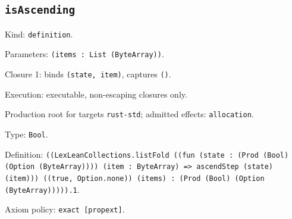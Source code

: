 \documentclass[11pt]{article}
\begin{document}
\subsection*{\texttt{isAscending}}
\noindent Kind: \texttt{definition}.\par
\noindent Parameters: \texttt{(items : List (ByteArray))}.\par
\noindent Closure 1: binds \texttt{(state, item)}, captures \texttt{()}.\par
\noindent Execution: executable, non-escaping closures only.\par
\noindent Production root for targets \texttt{rust-std}; admitted effects: \texttt{allocation}.\par
\noindent Type: \texttt{Bool}.\par
\noindent Definition: \texttt{((LexLeanCollections.listFold ((fun (state : (Prod (Bool) (Option (ByteArray)))) (item : ByteArray) => ascendStep (state) (item))) ((true, Option.none)) (items) : (Prod (Bool) (Option (ByteArray))))).1}.\par
\noindent Axiom policy: \texttt{exact [propext]}.\par
\end{document}
